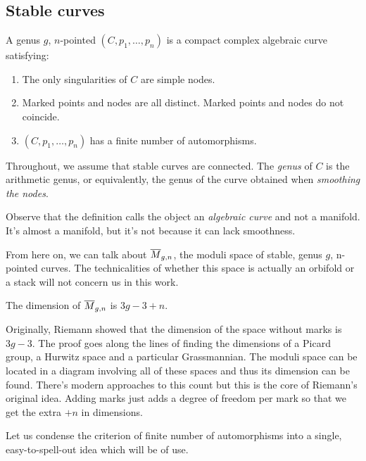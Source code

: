 \documentclass[12pt]{memoir}
\begin{document}
\subsection{Stable curves}

\begin{Def}
    A genus $g$, $n$-pointed  $(C,p_1,\dots,p_n)$ is a compact complex algebraic curve satisfying:
    \begin{enumerate}
        \item The only singularities of $C$ are simple nodes.
        \item Marked points and nodes are all distinct. Marked points and nodes do not coincide.
        \item\label{fin-number-auts} $(C,p_1,\dots,p_n)$ has a finite number of automorphisms.
    \end{enumerate}
    Throughout, we assume that stable curves are connected. The \emph{genus} of $C$ is the arithmetic genus, or equivalently, the genus of the curve obtained when \emph{smoothing the nodes}.
\end{Def}

\begin{Rmk}
Observe that the definition calls the object an \emph{algebraic curve} and not a manifold. It's almost a manifold, but it's not because it can lack smoothness.
\end{Rmk}

From here on, we can talk about $\overline{M}_{g,n}$, the moduli space of stable, genus $g$, n-pointed curves. The technicalities of whether this space is actually an orbifold or a stack will not concern us in this work. 

\begin{Prop}\label{prop-dim-Mgn}
    The dimension of $\overline{M}_{g,n}$ is $3g-3+n$.
\end{Prop}

Originally, Riemann showed that the dimension of the space without marks is $3g-3$. The proof goes along the lines of finding the dimensions of a Picard group, a Hurwitz space and a particular Grassmannian. The moduli space can be located in a diagram involving all of these spaces and thus its dimension can be found. There's modern approaches to this count but this is the core of Riemann's original idea. Adding marks just adds a degree of freedom per mark so that we get the extra $+n$ in dimensions.\par
Let us condense the criterion of finite number of automorphisms into a single, easy-to-spell-out idea which will be of use.
\end{document}
